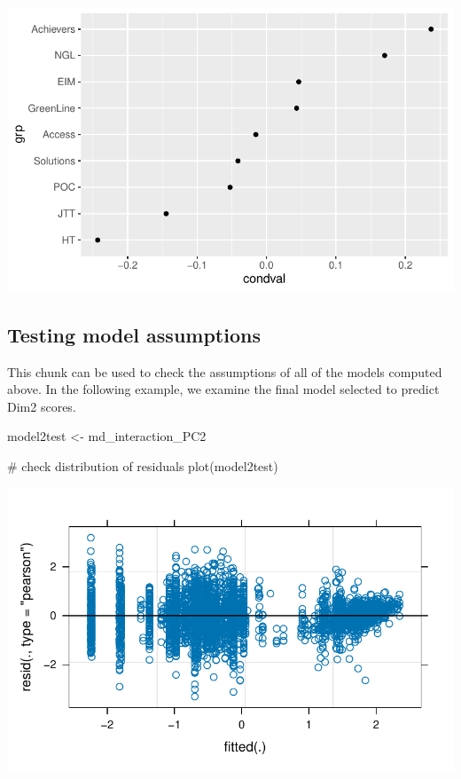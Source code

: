 \documentclass[
  letterpaper,
  DIV=11,
  numbers=noendperiod]{scrreprt}
\newenvironment{Shaded}{\begin{snugshade}}{\end{snugshade}}
\newcommand{\CommentTok}[1]{\textcolor[rgb]{0.37,0.37,0.37}{#1}}
\newcommand{\FunctionTok}[1]{\textcolor[rgb]{0.28,0.35,0.67}{#1}}
\newcommand{\NormalTok}[1]{\textcolor[rgb]{0.00,0.23,0.31}{#1}}
\newcommand{\OtherTok}[1]{\textcolor[rgb]{0.00,0.23,0.31}{#1}}
\begin{document}
\includegraphics{G_Ch7_Analysis_files/figure-pdf/unnamed-chunk-20-2.pdf}

\subsection{Testing model
assumptions}\label{testing-model-assumptions-1}

This chunk can be used to check the assumptions of all of the models
computed above. In the following example, we examine the final model
selected to predict Dim2 scores.

\begin{Shaded}
\begin{Highlighting}[]
\NormalTok{model2test }\OtherTok{\textless{}{-}}\NormalTok{ md\_interaction\_PC2}

\CommentTok{\# check distribution of residuals}
\FunctionTok{plot}\NormalTok{(model2test)}
\end{Highlighting}
\end{Shaded}

\includegraphics{G_Ch7_Analysis_files/figure-pdf/lmer-diagnostics-1.pdf}
\end{document}
